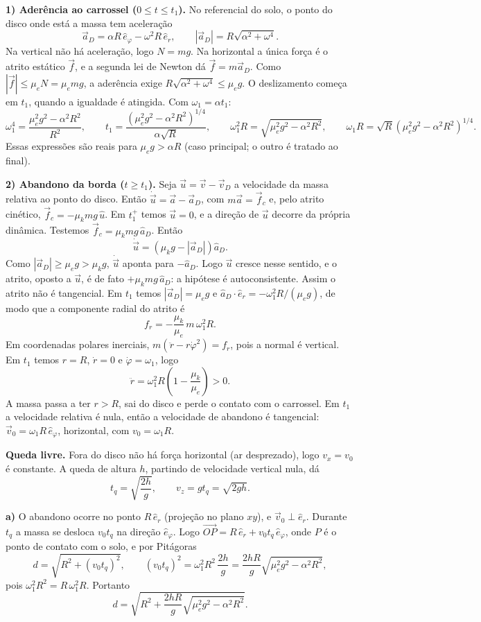 \documentclass{article}%
\begin{document}
\textbf{1) Aderência ao carrossel ($0\le t\le t_1$).} No referencial do solo, o ponto do disco onde está a massa tem aceleração
\[
\vec a_D=\alpha R\,\hat e_\varphi-\omega^2R\,\hat e_r,\qquad |\vec a_D|=R\sqrt{\alpha^2+\omega^4}.
\]
Na vertical não há aceleração, logo $N=mg$. Na horizontal a única força é o atrito estático $\vec f$, e a segunda lei de Newton dá $\vec f=m\vec a_D$. Como $|\vec f|\le\mu_eN=\mu_emg$, a aderência exige $R\sqrt{\alpha^2+\omega^4}\le\mu_eg$. O deslizamento começa em $t_1$, quando a igualdade é atingida. Com $\omega_1=\alpha t_1$:
\[
\omega_1^4=\frac{\mu_e^2g^2-\alpha^2R^2}{R^2},\qquad t_1=\frac{\left(\mu_e^2g^2-\alpha^2R^2\right)^{1/4}}{\alpha\sqrt R},\qquad \omega_1^2R=\sqrt{\mu_e^2g^2-\alpha^2R^2},\qquad \omega_1R=\sqrt R\left(\mu_e^2g^2-\alpha^2R^2\right)^{1/4}.
\]
Essas expressões são reais para $\mu_eg>\alpha R$ (caso principal; o outro é tratado ao final).

\textbf{2) Abandono da borda ($t\ge t_1$).} Seja $\vec u=\vec v-\vec v_D$ a velocidade da massa relativa ao ponto do disco. Então $\dot{\vec u}=\vec a-\vec a_D$, com $m\vec a=\vec f_c$ e, pelo atrito cinético, $\vec f_c=-\mu_kmg\,\hat u$. Em $t_1^+$ temos $\vec u=0$, e a direção de $\vec u$ decorre da própria dinâmica. Testemos $\vec f_c=\mu_kmg\,\hat a_D$. Então
\[
\dot{\vec u}=\left(\mu_kg-|\vec a_D|\right)\hat a_D .
\]
Como $|\vec a_D|\ge\mu_eg>\mu_kg$, $\dot{\vec u}$ aponta para $-\hat a_D$. Logo $\vec u$ cresce nesse sentido, e o atrito, oposto a $\vec u$, é de fato $+\mu_kmg\,\hat a_D$: a hipótese é autoconsistente. Assim o atrito não é tangencial. Em $t_1$ temos $|\vec a_D|=\mu_eg$ e $\hat a_D\cdot\hat e_r=-\omega_1^2R/(\mu_eg)$, de modo que a componente radial do atrito é
\[
f_r=-\frac{\mu_k}{\mu_e}\,m\,\omega_1^2R .
\]
Em coordenadas polares inerciais, $m(\ddot r-r\dot\varphi^2)=f_r$, pois a normal é vertical. Em $t_1$ temos $r=R$, $\dot r=0$ e $\dot\varphi=\omega_1$, logo
\[
\ddot r=\omega_1^2R\left(1-\frac{\mu_k}{\mu_e}\right)>0 .
\]
A massa passa a ter $r>R$, sai do disco e perde o contato com o carrossel. Em $t_1$ a velocidade relativa é nula, então a velocidade de abandono é tangencial: $\vec v_0=\omega_1R\,\hat e_\varphi$, horizontal, com $v_0=\omega_1R$.

\textbf{Queda livre.} Fora do disco não há força horizontal (ar desprezado), logo $v_x=v_0$ é constante. A queda de altura $h$, partindo de velocidade vertical nula, dá
\[
t_q=\sqrt{\frac{2h}{g}},\qquad v_z=gt_q=\sqrt{2gh}.
\]

\textbf{a)} O abandono ocorre no ponto $R\,\hat e_r$ (projeção no plano $xy$), e $\vec v_0\perp\hat e_r$. Durante $t_q$ a massa se desloca $v_0t_q$ na direção $\hat e_\varphi$. Logo $\vec{OP}=R\,\hat e_r+v_0t_q\,\hat e_\varphi$, onde $P$ é o ponto de contato com o solo, e por Pitágoras
\[
d=\sqrt{R^2+(v_0t_q)^2},\qquad (v_0t_q)^2=\omega_1^2R^2\,\frac{2h}{g}=\frac{2hR}{g}\sqrt{\mu_e^2g^2-\alpha^2R^2},
\]
pois $\omega_1^2R^2=R\,\omega_1^2R$. Portanto
\[
d=\sqrt{R^2+\frac{2hR}{g}\sqrt{\mu_e^2g^2-\alpha^2R^2}} .
\]
\end{document}
